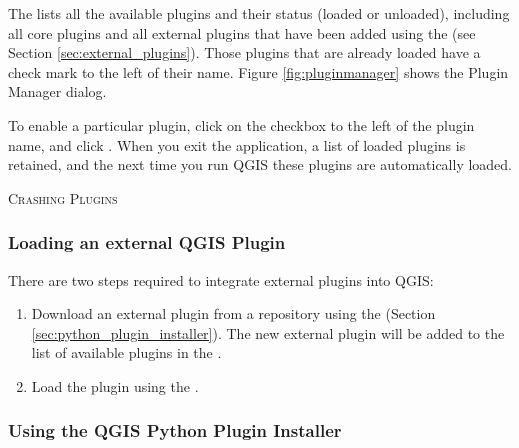 The  lists all the available plugins and their status (loaded or unloaded), 
including all core plugins and all external plugins that have been added using the  
(see Section \ref{sec:external_plugins}). Those plugins that are already loaded have a check mark 
to the left of their name. Figure \ref{fig:pluginmanager} shows the Plugin Manager dialog.

To enable a particular plugin, click on the checkbox to the left of the plugin name, and click . 
When you exit the application, a list of loaded plugins is retained, and the next time 
you run QGIS these plugins are automatically loaded.

\begin{Tip}\caption{\textsc{Crashing Plugins}}
\end{Tip} 

\subsubsection{Loading an external QGIS Plugin}\label{sec:load_external_plugin} 

There are two steps required to integrate external plugins into QGIS: 

\begin{enumerate}
\item Download an external plugin from a repository using the  (Section \ref{sec:python_plugin_installer}).
The new external plugin will be added to the list of available plugins in the .
\item Load the plugin using the .
\end{enumerate}

\subsubsection{Using the QGIS Python Plugin Installer}\label{sec:python_plugin_installer}

